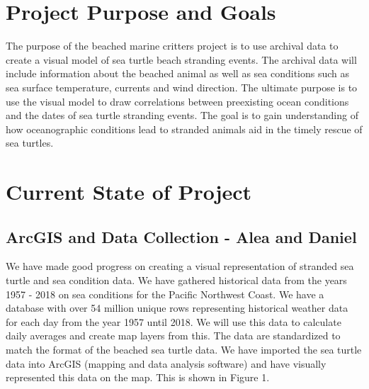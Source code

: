 \documentclass[onecolumn, draftclsnofoot,10pt, compsoc]{IEEEtran}
\begin{document}
\begin{titlepage}
\begin{singlespace}
\begin{abstract}
        \end{abstract}     
    \end{singlespace}
\end{titlepage}
\newpage
{}
\tableofcontents
\clearpage

\section{Project Purpose and Goals}
The purpose of the beached marine critters project is to use archival data to create a visual model of sea turtle beach stranding events. The archival data will include information about the beached animal as well as sea conditions such as sea surface temperature, currents and wind direction. The ultimate purpose is to use the visual model to draw correlations between preexisting ocean conditions and the dates of sea turtle stranding events. The goal is to gain understanding of how oceanographic conditions lead to stranded animals aid in the timely rescue of sea turtles.

\section{Current State of Project}
\subsection{ArcGIS and Data Collection - Alea and Daniel}
We have made good progress on creating a visual representation of stranded sea turtle and sea condition data.
We have gathered historical data from the years 1957 - 2018 on sea conditions for the Pacific Northwest Coast. We have a database with over 54 million unique rows representing historical weather data for each day from the year 1957 until 2018. We will use this data to calculate daily averages and create map layers from this. The data are standardized to match the format of the beached sea turtle data. We have imported the sea turtle data into ArcGIS (mapping and data analysis software) and have visually represented this data on the map. This is shown in Figure 1. \newline \newline
\end{document}
